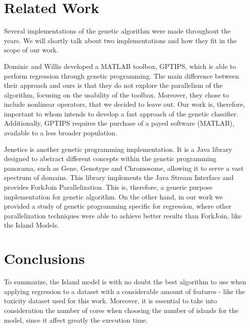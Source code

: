 \documentclass[runningheads]{llncs}
\begin{document}
\section{Related Work}

Several implementations of the genetic algorithm were made throughout the years. We will shortly talk about two implementations and how they fit in the scope of our work.

Dominic and Willis  \cite{GPTIPS} developed a MATLAB toolbox, GPTIPS, which is able to perform regression through genetic programming. The main difference between their approach and  ours is that they do not explore the parallelism of the algorithm, focusing on the usability of the toolbox. Moreover, they chose to include nonlinear operators, that we decided to leave out. Our work is, therefore, important to whom intends to develop a fast approach of the genetic classifier. Additionally, GPTIPS requires the purchase of a payed software (MATLAB), available to a less broader population.

Jenetics \cite{jenetics} is another genetic programming implementation. It is a Java library designed to abstract different concepts within the genetic programming panorama, such as Gene, Genotype and Chromosome, allowing it to serve a vast spectrum of domains. This library implements the Java Stream Interface and provides ForkJoin Parallelization. This is, therefore, a generic purpose implementation for genetic algorithm. On the other hand, in our work we provided a study of genetic programming specific for regression, where other parallelization techniques were able to achieve better results than ForkJoin, like the Island Models.

\section{Conclusions}

To summarize, the Island model is with no doubt  the best algorithm to use when applying regression to a dataset with a considerable amount of features - like the toxicity dataset used for this work. Moreover, it is essential to take into consideration the number of cores when choosing the number of islands for the model, since it affect greatly the execution time.
\end{document}
